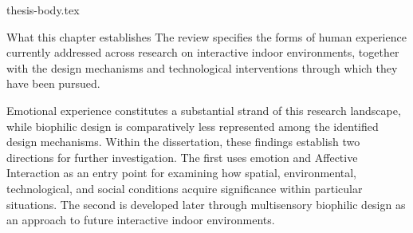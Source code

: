 \clearpage

{thesis-body.tex}
\FloatBarrier
\clearpage

\begin{chapterclosing}{What this chapter establishes}
The review specifies the forms of human experience currently addressed across research on interactive indoor environments, together with the design mechanisms and technological interventions through which they have been pursued.

Emotional experience constitutes a substantial strand of this research landscape, while biophilic design is comparatively less represented among the identified design mechanisms. Within the dissertation, these findings establish two directions for further investigation. The first uses emotion and Affective Interaction as an entry point for examining how spatial, environmental, technological, and social conditions acquire significance within particular situations. The second is developed later through multisensory biophilic design as an approach to future interactive indoor environments.

\end{chapterclosing}
